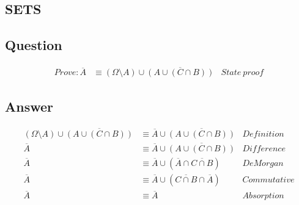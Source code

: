 \documentclass{article}
\begin{document}
\begin{center}
  \section*{SETS}
\end{center}
\subsection*{Question}
\begin{align}
  Prove: \overline{A} &\equiv \left(\Omega \setminus A \right) \cup \overline{\left(A \cup \left( C \cap B \right)\right)} & State~proof
\end{align}
\subsection*{Answer}
\begin{align}
  \left(\Omega \setminus A \right) \cup \overline{\left(A \cup \left( C \cap B \right)\right)} &\equiv \overline{A} \cup \overline{\left(A \cup \left( C \cap B \right)\right)} & Definition\\
  \overline{A} &\equiv \overline{A} \cup \overline{\left(A \cup \left(C \cap B\right) \right)} & Difference\\
  \overline{A} &\equiv \overline{A} \cup \left(\overline{A} \cap \overline{C \cap B} \right) & DeMorgan\\
  \overline{A} &\equiv \overline{A} \cup \left( \overline{C \cap B} \cap \overline{A} \right) & Commutative\\
  \overline{A} &\equiv \overline{A} & Absorption
\end{align}
\end{document}
